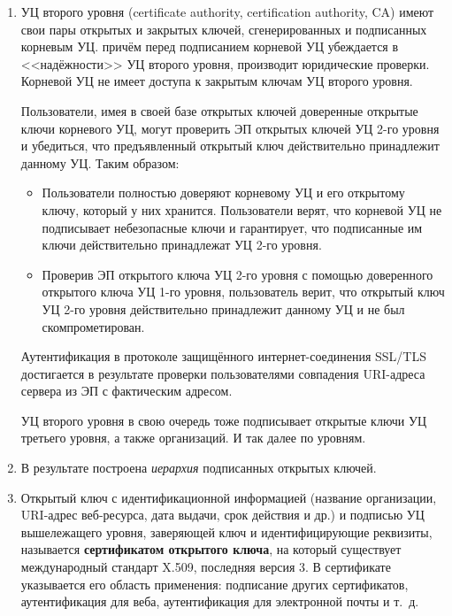 \begin{enumerate}
    \item УЦ второго уровня (certificate authority, certification authority, CA) имеют свои пары открытых и закрытых ключей, сгенерированных и подписанных корневым УЦ. причём перед подписанием корневой УЦ убеждается в <<надёжности>> УЦ второго уровня, производит юридические проверки. Корневой УЦ не имеет доступа к закрытым ключам УЦ второго уровня.

        Пользователи, имея в своей базе открытых ключей доверенные открытые ключи корневого УЦ, могут проверить ЭП открытых ключей УЦ 2-го уровня и убедиться, что предъявленный открытый ключ действительно принадлежит данному УЦ. Таким образом:
        \begin{itemize}
            \item Пользователи полностью доверяют корневому УЦ и его открытому ключу, который у них хранится. Пользователи верят, что корневой УЦ не подписывает небезопасные ключи и гарантирует, что подписанные им ключи действительно принадлежат УЦ 2-го уровня.
            \item Проверив ЭП открытого ключа УЦ 2-го уровня с помощью доверенного открытого ключа УЦ 1-го уровня, пользователь верит, что открытый ключ УЦ 2-го уровня действительно принадлежит данному УЦ и не был скомпрометирован.
        \end{itemize}

        Аутентификация в протоколе защищённого интернет-соединения SSL/TLS достигается в результате проверки пользователями совпадения URI-адреса сервера из ЭП с фактическим адресом.

        УЦ второго уровня в свою очередь тоже подписывает открытые ключи УЦ третьего уровня, а также организаций. И так далее по уровням.

    \item В результате построена \emph{иерархия} подписанных открытых ключей.

    \item Открытый ключ с идентификационной информацией (название организации, URI-адрес веб-ресурса, дата выдачи, срок действия и др.) и подписью УЦ вышележащего уровня, заверяющей ключ и идентифицирующие реквизиты, называется \textbf{сертификатом открытого ключа}, на который существует международный стандарт X.509, последняя версия 3. В сертификате указывается его область применения: подписание других сертификатов, аутентификация для веба, аутентификация для электронной почты и т.~д.
\end{enumerate}

